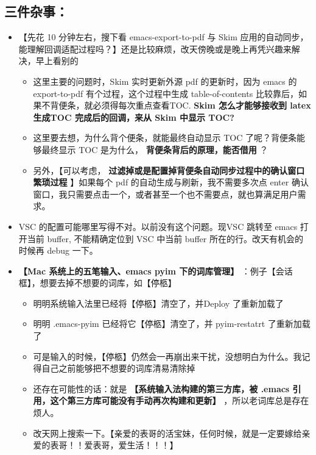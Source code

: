 \documentclass[9pt, b5paper]{article}
\begin{document}
\subsection{三件杂事：}
\label{sec-7-11}
\begin{itemize}
\item 【先花 10 分钟左右，搜下看 emacs-export-to-pdf 与 Skim 应用的自动同步，能理解回调适配过程吗？】还是比较麻烦，改天傍晚或是晚上再凭兴趣来解决，早上看别的
\begin{itemize}
\item 这里主要的问题时，Skim 实时更新外源 pdf 的更新时，因为 emacs 的 export-to-pdf 有个过程，这个过程中生成 table-of-contents 比较靠后，如果不背便条，就必须得每次重点查看TOC. \textbf{Skim 怎么才能够接收到 latex 生成TOC 完成后的回调，来从 Skim 中显示 TOC?}
\item 这里要去想，为什么背个便条，就能最终自动显示 TOC 了呢？背便条能够最终显示 TOC 是为什么， \textbf{背便条背后的原理，能否借用} ？
\item 另外，【可以考虑， \textbf{过滤掉或是配置掉背便条自动同步过程中的确认窗口繁琐过程} 】如果每个 pdf 的自动生成与刷新，我不需要多次点 enter 确认窗口，我只需要点击一个，或者甚至一个也不需要点，就也算满足用户需求。
\end{itemize}
\item VSC 的配置可能哪里写得不对。以前没有这个问题。现VSC 跳转至 emacs 打开当前 buffer, 不能精确定位到 VSC 中当前 buffer 所在的行。改天有机会的时候再 debug 一下。
\item \textbf{【Mac 系统上的五笔输入、emacs pyim 下的词库管理】} ：例子【会话框】，想要去掉不想要的词库，如【停柩】
\begin{itemize}
\item 明明系统输入法里已经将【停柩】清空了，并Deploy 了重新加载了
\item 明明 .emacs-pyim 已经将它【停柩】清空了，并 pyim-restatrt 了重新加载了
\item 可是输入的时候，【停柩】仍然会一再崩出来干扰，没想明白为什么。我记得自己之前能够把不想要的词库清易清除掉
\item 还存在可能性的话：就是 \textbf{【系统输入法构建的第三方库，被 .emacs 引用，这个第三方库可能没有手动再次构建和更新】} ，所以老词库总是存在烦人。
\item 改天网上搜索一下。【亲爱的表哥的活宝妹，任何时候，就是一定要嫁给亲爱的表哥！！爱表哥，爱生活！！！】
\end{itemize}
\end{itemize}
\end{document}
